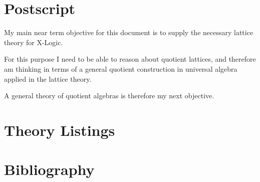 
\section{Postscript}\label{POSTSCRIPT}

My main near term objective for this document is to supply the necessary lattice theory for X-Logic.

For this purpose I need to be able to reason about quotient lattices, and therefore am thinking in terms of a general quotient construction in universal algebra applied in the lattice theory.

A general theory of quotient algebras is therefore my next objective.

\pagebreak
\appendix

\section{Theory Listings}
{
\let\Section\subsection
\let\Subsection\subsubsection
\def\subsection#1{\Subsection*{#1}}

\def\section#1{\Section{#1}\label{equiv}}

\pagebreak
\def\section#1{\Section{#1}\label{unalg}}

\pagebreak
\def\section#1{\Section{#1}\label{lattice}}

}  %

\pagebreak

\section*{Bibliography}\label{BIBLIOGRAPHY}

{\def\section*#1{\ignore{#1}}
\raggedright


} %

{
{\small\printindex}}


